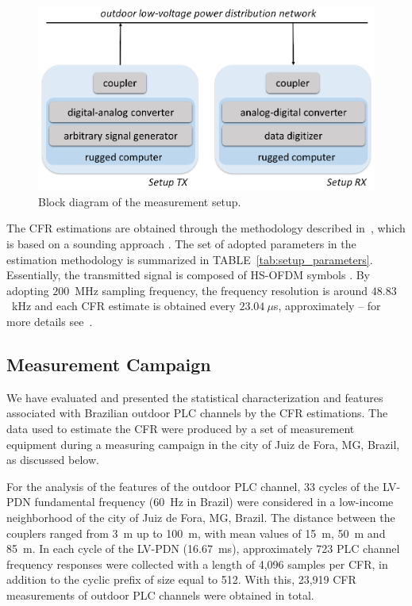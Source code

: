 \documentclass[journal]{IEEEtran}
\begin{document}
\begin{figure}[htb]
\begin{centering}
    \includegraphics[scale=.6]{Figuras/setups.eps}
    \caption{Block diagram of the measurement setup.}
    \label{fig:setup}
\end{centering}
\end{figure}

The \ac{CFR} \color{blue} estimations \color{black} are obtained through the  methodology described in~\cite{Oliveira2014}, which is based on a sounding approach \cite{Parsons1991}. 
The set of adopted parameters in the estimation methodology is summarized in TABLE~\ref{tab:setup_parameters}.
Essentially, the transmitted signal is composed of \ac{HS-OFDM} symbols \cite{Ribeiro2014a}. 
By adopting  $200$~MHz sampling frequency, the frequency resolution is around $48.83$~kHz and each \ac{CFR} estimate is obtained every $23.04~\mu$s, approximately -- for more details see~\cite{Oliveira2013a}. 

\subsection{Measurement Campaign}

 We have evaluated and presented the statistical characterization and features associated with Brazilian outdoor PLC channels by the \ac{CFR} estimations. \color{black}
The data used to estimate the CFR were produced by a set of measurement equipment during a \color{blue} measuring campaign \color{black} in the city of Juiz de Fora, MG, Brazil, as discussed \color{blue} below.


For the analysis of the features of the outdoor PLC channel, 33 cycles of the \ac{LV-PDN} fundamental frequency (60~Hz in Brazil) were considered in a low-income neighborhood of the city of Juiz de Fora, MG, Brazil. 
The distance between the couplers ranged from 3~m up to 100~m, with mean values of 15~m, 50~m and 85~m. 
In each cycle of the \ac{LV-PDN} (16.67~ms), approximately 723 PLC channel frequency responses were collected with a length of 4,096 samples per CFR, in addition to the cyclic prefix of size equal to 512. 
With this, 23,919 CFR measurements of outdoor PLC channels were \color{blue} obtained \color{black} in total.
\end{document}
